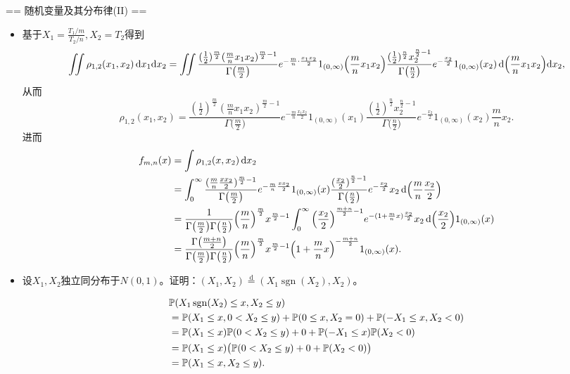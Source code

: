 == 随机变量及其分布律(II) ==
\begin{itemize}
    \item[例8.19]
    基于$X_1=\frac{T_1/m}{T_2/n},X_2=T_2$得到
    \[\iint\rho_{1,2}(x_1,x_2)\,{\rm d}x_1{\rm d}x_2
    =\iint\frac{(\frac12)^{\frac m2}(\frac mn x_1x_2)^{\frac m2-1}}
    {\Gamma\big(\frac m2\big)}e^{-\frac mn\cdot\frac{x_1x_2}{2}}1_{(0,\infty)}
    \Big(\frac mn x_1x_2\Big)
    \frac{(\frac12)^{\frac n2}x_2^{\frac n2-1}}
    {\Gamma\big(\frac n2\big)}e^{-\frac{x_2}{2}}1_{(0,\infty)}(x_2)
    \,{\rm d}\Big(\frac mn x_1x_2\Big){\rm d}x_2,\]
    从而
    \[\rho_{1,2}(x_1,x_2)
    =\frac{(\frac12)^{\frac m2}(\frac mn x_1x_2)^{\frac m2-1}}
    {\Gamma\big(\frac m2\big)}e^{-\frac mn\frac{x_1x_2}{2}}1_{(0,\infty)}(x_1)
    \frac{(\frac12)^{\frac n2}x_2^{\frac n2-1}}
    {\Gamma\big(\frac n2\big)}e^{-\frac{x_2}{2}}1_{(0,\infty)}(x_2)\frac mn x_2.\]
    进而
    \begin{align*}
        f_{m,n}(x)&=\int\rho_{1,2}(x,x_2)\,{\rm d}x_2\\
        &=\int_0^\infty\frac{(\frac mn\frac{xx_2}{2})^{\frac m2-1}}
        {\Gamma\big(\frac m2\big)}e^{-\frac mn\frac{xx_2}{2}}1_{(0,\infty)}(x)
        \frac{{(\frac{x_2}{2})}^{\frac n2-1}}{\Gamma\big(\frac n2\big)}
        e^{-\frac{x_2}{2}}x_2\,{\rm d}\Big(\frac mn\frac{x_2}{2}\Big)\\
        &=\frac{1}{\Gamma\big(\frac m2\big)\Gamma\big(\frac n2\big)}
        \Big(\frac mn\Big)^{\frac m2}
        x^{\frac m2-1}\int_0^\infty\Big(\frac{x_2}{2}\Big)^{\frac{m+n}{2}-1}
        e^{-(1+\frac mn x)\frac{x_2}{2}}
        x_2\,{\rm d}\Big(\frac{x_2}{2}\Big)1_{(0,\infty)}(x)\\
        &=\frac{\Gamma\big(\frac{m+n}{2}\big)}{\Gamma\big(\frac m2\big)\Gamma\big(\frac n2\big)}
        \Big(\frac mn\Big)^{\frac m2}
        x^{\frac m2-1}\Big(1+\frac mn x\Big)^{-\frac{m+n}{2}}1_{(0,\infty)}(x).
    \end{align*}

    \item[$\boxed{思考题}$]
    设$X_1,X_2$独立同分布于$N(0,1)$。证明：$(X_1,X_2)\stackrel{\mathrm{d}}{=}(X_1\operatorname{sgn}(X_2),X_2)$。

    \begin{align*}
        &\mathbb{P}(X_1\operatorname{sgn}(X_2)\le x,X_2\le y)\\
        &=\mathbb{P}(X_1\le x,0<X_2\le y)+\mathbb{P}(0\le x,X_2=0)+\mathbb{P}(-X_1\le x,X_2<0)\\
        &=\mathbb{P}(X_1\le x)\mathbb{P}(0<X_2\le y)+0+\mathbb{P}(-X_1\le x)\mathbb{P}(X_2<0)\\
        &=\mathbb{P}(X_1\le x)\big(\mathbb{P}(0<X_2\le y)+0+\mathbb{P}(X_2<0)\big)\\
        &=\mathbb{P}(X_1\le x,X_2\le y).
    \end{align*}


\end{itemize}
